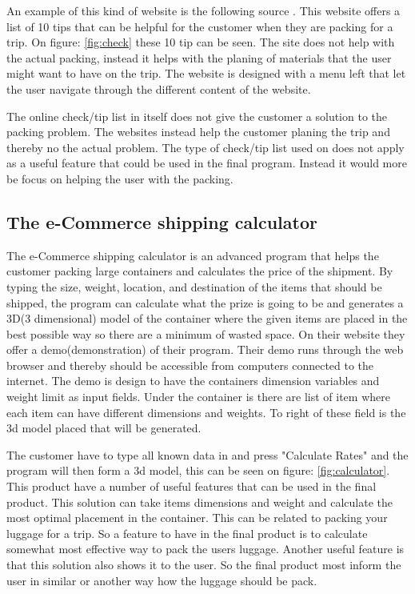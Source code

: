 
An example of this kind of website is the following source \citep{onlinecheck}. This website offers a list of 10 tips that can be helpful for the customer when they are packing for a trip. On figure: \ref{fig:check} these 10 tip can be seen.
The site does not help with the actual packing, instead it helps with the planing of materials that the user might want to have on the trip.
The website is designed with a menu left that let the user navigate through the different content of the website.

The online check/tip list in itself does not give the customer a solution to the packing problem. The websites instead help the customer planing the trip and thereby no the actual problem. The type of check/tip list used on \citep{onlinecheck} does not apply as a useful feature that could be used in the final program. Instead it would more be focus on helping the user with the packing.

\subsection*{The e-Commerce shipping calculator}

The e-Commerce shipping calculator is an advanced program that helps the customer packing large containers and calculates the price of the shipment.
By typing the size, weight, location, and destination of the items that should be shipped, the program can calculate what the prize is going to be and generates a 3D(3 dimensional) model of the container where the given items are placed in the best possible way so there are a minimum of wasted space. On their website \citep{solvingmaze} they offer a demo(demonstration) of their program. Their demo runs through the web browser and thereby should be accessible from computers connected to the internet.
The demo is design to have the containers dimension variables and weight limit as input fields. Under the container is there are list of item where each item can have different dimensions and weights. To right of these field is the 3d model placed that will be generated.


The customer have to type all known data in and press "Calculate Rates" and the program will then form a 3d model, this can be seen on figure: \ref{fig:calculator}.
This product have a number of useful features that can be used in the final product. This solution can take items dimensions and weight and calculate the most optimal placement in the container. This can be related to packing your luggage for a trip. So a feature to have in the final product is to  calculate somewhat most effective way to pack the users luggage. Another useful feature is that this solution also shows it to the user. So the final product most inform the user in similar or another way how the luggage should be pack.

